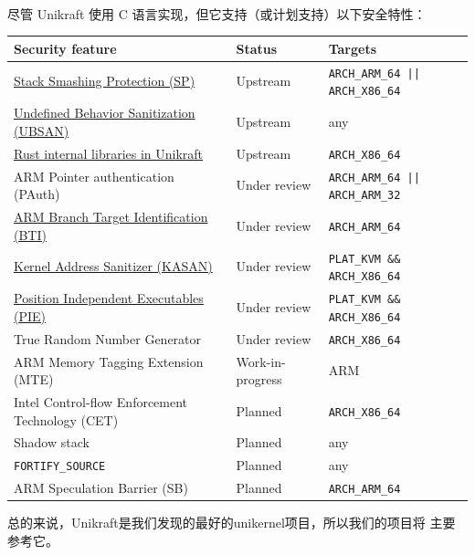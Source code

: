 \documentclass[UTF8,fontset=none,linespread=1.15]{ctexart}
\let\nosupcite\cite
\renewcommand*{\cite}[1]{\textsuperscript{\nosupcite{#1}}}
\begin{document}
尽管 Unikraft 使用 C 语言实现，但它支持（或计划支持）以下安全特性\cite{bib:unikraft-secuirty}：
{\small
\begin{longtable}{|l|l|l|}
\hline
\textbf{Security feature}&\textbf{Status}&\textbf{Targets}\\\hline
\endhead

\href{https://github.com/unikraft/unikraft/tree/staging/lib/uksp}{Stack Smashing Protection (SP)}& Upstream& \texttt{ARCH\_ARM\_64 || ARCH\_X86\_64}\\\hline
\href{https://github.com/unikraft/unikraft/tree/staging/lib/ubsan}{Undefined Behavior Sanitization (UBSAN)}& Upstream& any\\\hline
\href{https://github.com/unikraft/unikraft/tree/staging/lib/ukrust}{Rust internal libraries in Unikraft}& Upstream &\texttt{ARCH\_X86\_64}\\\hline
ARM Pointer authentication (PAuth)& Under review     & \texttt{ARCH\_ARM\_64 || ARCH\_ARM\_32}\\\hline
\href{https://github.com/unikraft/unikraft/pull/421}{ARM Branch Target Identification (BTI)}& Under review&\texttt{ARCH\_ARM\_64}\\\hline
\href{https://github.com/unikraft/unikraft/pull/191}{Kernel Address Sanitizer (KASAN)}&Under review&\texttt{PLAT\_KVM \&\& ARCH\_X86\_64}\\\hline
\href{https://github.com/unikraft/unikraft/pull/239}{Position Independent Executables (PIE)}& Under review &\texttt{PLAT\_KVM \&\& ARCH\_X86\_64}\\\hline
True Random Number Generator& Under review     & \texttt{ARCH\_X86\_64}\\\hline
ARM Memory Tagging Extension (MTE)  & Work-in-progress &ARM \\\hline
Intel Control-flow Enforcement Technology (CET) & Planned  & \texttt{ARCH\_X86\_64}\\\hline
Shadow stack & Planned          & any\\\hline
\texttt{FORTIFY\_SOURCE}   & Planned    & any\\\hline
ARM Speculation Barrier (SB)  & Planned   & \texttt{ARCH\_ARM\_64}\\\hline
\end{longtable}
}

总的来说，Unikraft是我们发现的最好的unikernel项目，所以我们的项目将
主要参考它。
\end{document}
